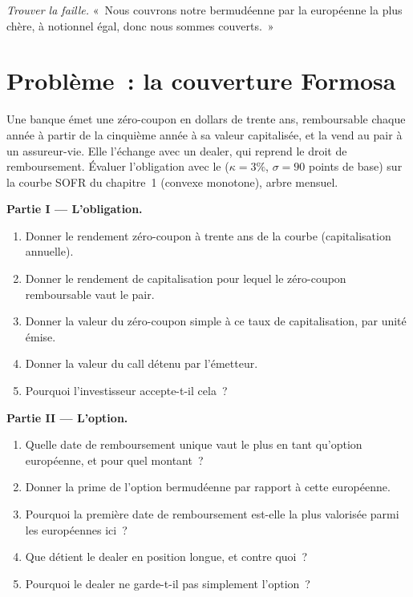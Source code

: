 \begin{exercise}[$\star\star\star$]\label{exo:rc:bermudans-and-callables:8}
\emph{Trouver la faille.} «~Nous couvrons notre bermudéenne par la  européenne la plus chère,
à notionnel égal, donc nous sommes couverts.~»
\end{exercise}

\section{Problème~: la couverture Formosa}

\begin{problem}\label{pb:rc:bermudans-and-callables:1}
Une banque émet une  zéro-coupon en dollars de trente ans, remboursable chaque année à partir de
la cinquième année à sa valeur capitalisée, et la vend au pair à un assureur-vie. Elle l'échange
avec un dealer, qui reprend le droit de remboursement. Évaluer l'obligation avec le  ($\kappa=3\%$,
$\sigma=90$ points de base) sur la courbe SOFR du chapitre~1 (convexe monotone), arbre mensuel.

\medskip\noindent\textbf{Partie I --- L'obligation.}
\begin{enumerate}
\item Donner le rendement zéro-coupon à trente ans de la courbe (capitalisation annuelle).
\item Donner le rendement de capitalisation pour lequel le zéro-coupon remboursable vaut le pair.
\item Donner la valeur du zéro-coupon simple à ce taux de capitalisation, par unité émise.
\item Donner la valeur du call détenu par l'émetteur.
\item Pourquoi l'investisseur accepte-t-il cela~?
\end{enumerate}

\medskip\noindent\textbf{Partie II --- L'option.}
\begin{enumerate}[resume]
\item Quelle date de remboursement unique vaut le plus en tant qu'option européenne, et pour quel montant~?
\item Donner la prime de l'option bermudéenne par rapport à cette européenne.
\item Pourquoi la première date de remboursement est-elle la plus valorisée parmi les européennes ici~?
\item Que détient le dealer en position longue, et contre quoi~?
\item Pourquoi le dealer ne garde-t-il pas simplement l'option~?
\end{enumerate}


\end{problem}
